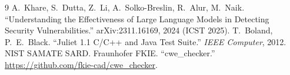 \documentclass[10pt]{article}
\begin{document}
\begin{thebibliography}{9}
 A.~Khare, S.~Dutta, Z.~Li, A.~Solko-Breslin, R.~Alur, M.~Naik.
``Understanding the Effectiveness of Large Language Models in Detecting Security
Vulnerabilities.'' arXiv:2311.16169, 2024 (ICST 2025).
 T.~Boland, P.~E.~Black. ``Juliet 1.1 C/C++ and Java Test Suite.''
\textit{IEEE Computer}, 2012. NIST SAMATE SARD.
 Fraunhofer FKIE. ``cwe\_checker.''
\url{https://github.com/fkie-cad/cwe_checker}.
\end{thebibliography}
\end{document}
